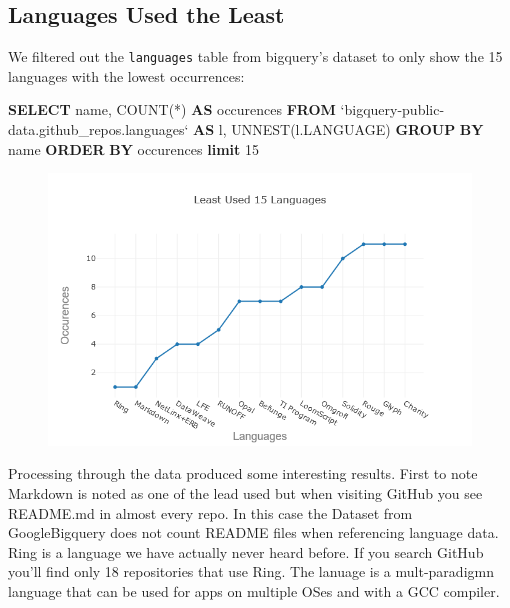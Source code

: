 \documentclass[11pt]{article}
\makeatletter
\def\maxwidth{\ifdim\Gin@nat@width>\linewidth\linewidth
    \else\Gin@nat@width\fi}
\let\Oldincludegraphics\includegraphics
\renewcommand{\includegraphics}[1]{\Oldincludegraphics[width=.8\maxwidth]{#1}}
\newenvironment{Shaded}{}{}
\newcommand{\KeywordTok}[1]{\textcolor[rgb]{0.00,0.44,0.13}{\textbf{{#1}}}}
\newcommand{\DecValTok}[1]{\textcolor[rgb]{0.25,0.63,0.44}{{#1}}}
\newcommand{\FunctionTok}[1]{\textcolor[rgb]{0.02,0.16,0.49}{{#1}}}
\newcommand{\NormalTok}[1]{{#1}}
\makeatother
\begin{document}
    \subsection{Languages Used the Least}\label{languages-used-the-least}

    We filtered out the \texttt{languages} table from bigquery's dataset to
only show the 15 languages with the lowest occurrences:

\begin{Shaded}
\begin{Highlighting}[]
	\KeywordTok{SELECT}
	\NormalTok{  name,}
	\FunctionTok{COUNT}\NormalTok{(*) }\KeywordTok{AS}\NormalTok{ occurences}
	\KeywordTok{FROM}
	\NormalTok{  `bigquery-public-data.github_repos.languages` }\KeywordTok{AS}\NormalTok{ l,}
	\NormalTok{  UNNEST(l.LANGUAGE)}
	\KeywordTok{GROUP} \KeywordTok{BY}
	\NormalTok{  name}
	\KeywordTok{ORDER} \KeywordTok{BY}
	\NormalTok{  occurences }
	\KeywordTok{limit} \DecValTok{15}
\end{Highlighting}
\end{Shaded}


\begin{figure}[H]
\centering
\includegraphics{newplot2.png}
\caption{}
\end{figure}

    Processing through the data produced some interesting results. First to
note Markdown is noted as one of the lead used but when visiting GitHub
you see README.md in almost every repo. In this case the Dataset from
GoogleBigquery does not count README files when referencing language
data. Ring is a language we have actually never heard before. If you
search GitHub you'll find only 18 repositories that use Ring. The
lanuage is a mult-paradigmn language that can be used for apps on
multiple OSes and with a GCC compiler.
\end{document}
